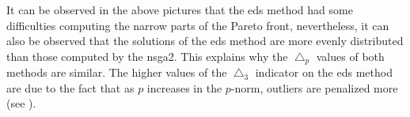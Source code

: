 It can be observed in the above pictures that the \gls{eds} method had some difficulties computing the narrow parts of the Pareto front, nevertheless, it can also be observed that the solutions of the \gls{eds} method are more evenly distributed than those computed by the \gls{nsga2}. This explains why the $\bigtriangleup_p$ values of both methods are similar. The higher values of the $\bigtriangleup_3$ indicator on the \gls{eds} method are due to the fact that as $p$ increases in the $p$-norm, outliers are penalized more (see \cite{delta_p}).